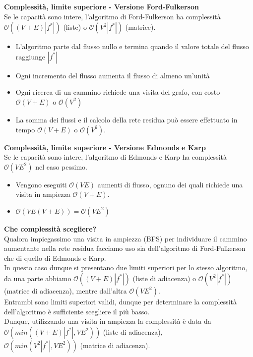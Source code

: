 \documentclass[../cheatSheetAlgoritmi.tex]{subfiles}
\begin{document}
\bigskip
\textbf{Complessità, limite superiore - Versione Ford-Fulkerson} \\
Se le capacità sono intere, l'algoritmo di Ford-Fulkerson ha complessità $\mathcal{O}((V + E)|f^{*}|)$ (liste) o $\mathcal{O}(V^2 |f^*|)$ (matrice).
\begin{itemize}
	\item L'algoritmo parte dal flusso nullo e termina quando il valore totale del flusso raggiunge $|f^*|$
	\item Ogni incremento del flusso aumenta il flusso di almeno un'unità
	\item Ogni ricerca di un cammino richiede una visita del grafo, con costo $\mathcal{O}(V + E)$ o $\mathcal{O}(V^2)$
	\item La somma dei flussi e il calcolo della rete residua può essere effettuato in tempo $\mathcal{O}(V + E) $ o $\mathcal{O}(V^2)$.
\end{itemize}
\textbf{Complessità, limite superiore - Versione Edmonds e Karp} \\
Se le capacità sono intere, l'algoritmo di Edmonds e Karp ha complessità $\mathcal{O}(VE^2)$ nel caso pessimo. 
\begin{itemize}
	\item Vengono eseguiti $\mathcal{O}(VE)$ aumenti di flusso, ognuno dei quali richiede una visita in ampiezza $\mathcal{O}(V + E)$.
	\item $\mathcal{O}(VE(V + E)) = \mathcal{O}(VE^2)$
\end{itemize}
\textbf{Che complessità scegliere?}\\
Qualora impiegassimo una visita in ampiezza (BFS) per individuare il cammino aumentante nella rete residua facciamo uso sia dell'algoritmo di Ford-Fulkerson che di quello di Edmonds e Karp. \\
In questo caso dunque si presentano due limiti superiori per lo stesso algoritmo, da una parte abbiamo $\mathcal{O}((V + E)|f^{*}|)$ (liste di adiacenza) o $\mathcal{O}(V^2 |f^*|)$ (matrice di adiacenza), mentre dall'altra  $\mathcal{O}(VE^2)$.\\
Entrambi sono limiti superiori validi, dunque per determinare la complessità dell'algoritmo è sufficiente scegliere il più basso. \\
Dunque, utilizzando una visita in ampiezza la complessità è data da $\mathcal{O}(min((V + E)|f^{*}|, VE^2))$ (liste di adiacenza),\\ $\mathcal{O}(min(V^2|f^{*}|, VE^2))$ (matrice di adiacenza).
\end{document}
